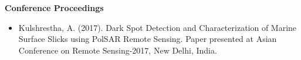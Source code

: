 \documentclass[10pt,a4paper]{altacv}
\begin{document}

\printbibliography[heading=pubtype,title={\printinfo{\faFileTextO}{Journal Articles}},type=article]

\printbibliography[heading=pubtype,title={\printinfo{\faGroup}{Conference Proceedings}},type=inproceedings]


\faGroup 
\textbf{Conference Proceedings}
\vspace{.3cm}
\begin{itemize}
\item Kulshrestha, A. (2017). Dark Spot Detection and Characterization of Marine Surface Slicks using PolSAR Remote Sensing. Paper presented at Asian Conference on Remote Sensing-2017, New Delhi, India.
\end{itemize}
\end{document}
